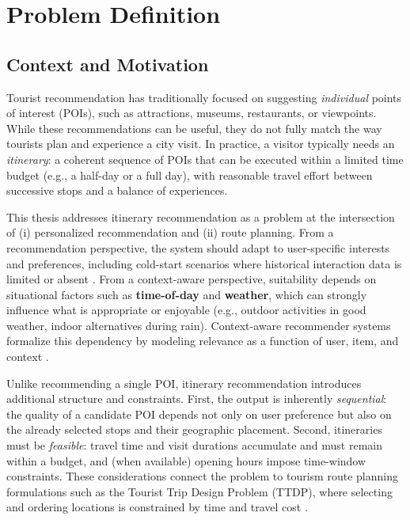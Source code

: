 \chapter{Problem Definition}
\label{ch:problem}

\section{Context and Motivation}
\label{sec:prob-context}

Tourist recommendation has traditionally focused on suggesting \emph{individual} points of interest (POIs), such as attractions, museums, restaurants, or viewpoints. While these recommendations can be useful, they do not fully match the way tourists plan and experience a city visit. In practice, a visitor typically needs an \emph{itinerary}: a coherent sequence of POIs that can be executed within a limited time budget (e.g., a half-day or a full day), with reasonable travel effort between successive stops and a balance of experiences.

This thesis addresses itinerary recommendation as a problem at the intersection of (i) personalized recommendation and (ii) route planning. From a recommendation perspective, the system should adapt to user-specific interests and preferences, including cold-start scenarios where historical interaction data is limited or absent \citep{koren2009mf, burke2002hybrid}. From a context-aware perspective, suitability depends on situational factors such as \textbf{time-of-day} and \textbf{weather}, which can strongly influence what is appropriate or enjoyable (e.g., outdoor activities in good weather, indoor alternatives during rain). Context-aware recommender systems formalize this dependency by modeling relevance as a function of user, item, and context \citep{adomavicius2005tois, adomavicius2022cars, villegas2018cars}.

Unlike recommending a single POI, itinerary recommendation introduces additional structure and constraints. First, the output is inherently \emph{sequential}: the quality of a candidate POI depends not only on user preference but also on the already selected stops and their geographic placement. Second, itineraries must be \emph{feasible}: travel time and visit durations accumulate and must remain within a budget, and (when available) opening hours impose time-window constraints. These considerations connect the problem to tourism route planning formulations such as the Tourist Trip Design Problem (TTDP), where selecting and ordering locations is constrained by time and travel cost \citep{gavalas2014ttdp}.

